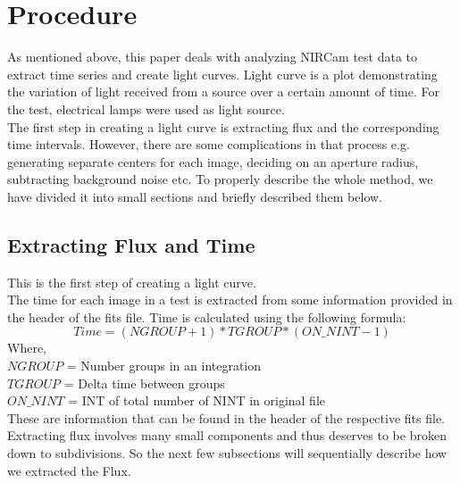 \documentclass[conference]{IEEEtran}
\begin{document}
\section{Procedure}
As mentioned above, this paper deals with analyzing NIRCam test data to extract time series and create light curves. Light curve is a plot demonstrating the variation of light received from a source over a certain amount of time. For the test, electrical lamps were used as light source.\\
The first step in creating a light curve is extracting flux and the corresponding time intervals. However, there are some complications in that process e.g. generating separate centers for each image, deciding on an aperture radius, subtracting background noise etc. To properly describe the whole method, we have divided it into small sections and briefly described them below.   


\subsection{Extracting Flux and Time}
This is the first step of creating a light curve.\\
The time for each image in a test is extracted from some information provided in the header of the fits file. Time is calculated using the following formula:
$$Time =  (NGROUP  + 1) * TGROUP * (ON\_NINT - 1)$$
Where, \\
$NGROUP$ = Number groups in an integration\\
$TGROUP$ = Delta time between groups\\
$ON\_NINT$ = INT of total number of NINT in original file\\
These are information that can be found in the header of the respective fits file. \\
Extracting flux involves many small components and thus deserves to be broken down to subdivisions. So the next few subsections will sequentially describe how we extracted the Flux.
\end{document}
